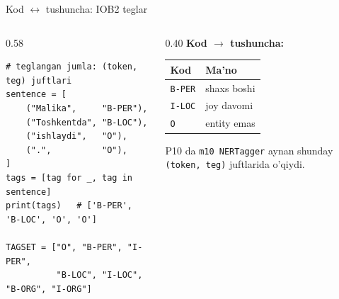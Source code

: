 \documentclass[aspectratio=169,11pt]{beamer}
\begin{document}
\begin{frame}[fragile]{Kod $\leftrightarrow$ tushuncha: IOB2 teglar}
  \begin{columns}[T]
    \begin{column}{0.58\textwidth}
\begin{lstlisting}
# teglangan jumla: (token, teg) juftlari
sentence = [
    ("Malika",     "B-PER"),
    ("Toshkentda", "B-LOC"),
    ("ishlaydi",   "O"),
    (".",          "O"),
]
tags = [tag for _, tag in sentence]
print(tags)   # ['B-PER', 'B-LOC', 'O', 'O']

TAGSET = ["O", "B-PER", "I-PER",
          "B-LOC", "I-LOC", "B-ORG", "I-ORG"]
\end{lstlisting}
    \end{column}
    \begin{column}{0.40\textwidth}
      \textbf{Kod $\to$ tushuncha:}\\[3pt]
      \footnotesize
      \begin{tabular}{p{2.0cm}p{2.0cm}}
        \toprule
        Kod & Ma'no \\
        \midrule
        \texttt{B-PER} & shaxs boshi \\
        \texttt{I-LOC} & joy davomi \\
        \texttt{O} & entity emas \\
        \bottomrule
      \end{tabular}
      \vspace{4pt}
      \begin{tcolorbox}[okbox,top=2pt,bottom=2pt]
        \footnotesize
        P10 da \texttt{m10 NERTagger} aynan shunday \texttt{(token, teg)} juftlarida
        o'qiydi.
      \end{tcolorbox}
    \end{column}
  \end{columns}
\end{frame}
\end{document}
